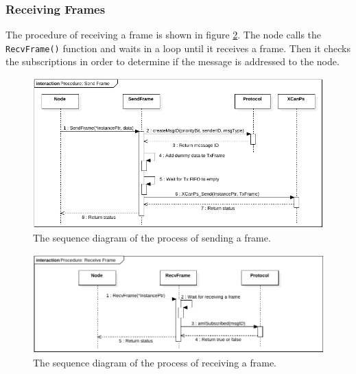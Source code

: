 \subsubsection*{Receiving Frames}
The procedure of receiving a frame is shown in figure \ref{fig:SeqDiagram_RecvFrame}.
The node calls the \texttt{RecvFrame()} function and waits in a loop until it receives a frame.
Then it checks the subscriptions in order to determine if the message is addressed to the node.
\begin{figure}[h!]
	\centering
	\includegraphics[width = 1\linewidth]{graphics/SeqDiagram_SendFrame.pdf}
	\caption{The sequence diagram of the process of sending a frame.}
	\label{fig:SeqDiagram_SendFrame}
\end{figure}

\begin{figure}[h!]
	\centering
	\includegraphics[width = 1\linewidth]{graphics/SeqDiagram_RecvFrame.pdf}
	\caption{The sequence diagram of the process of receiving a frame.}
	\label{fig:SeqDiagram_RecvFrame}
\end{figure}
